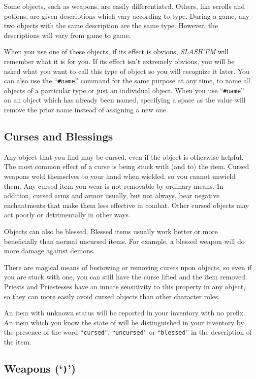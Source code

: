 Some objects, such as weapons, are easily differentiated.  Others, like
scrolls and potions, are given descriptions which vary according to
type.  During a game, any two objects with the same description are
the same type.  However, the descriptions will vary from game to game.

When you use one of these objects, if its effect is obvious, {\it SLASH'EM\/}
will remember what it is for you.  If its effect isn't extremely
obvious, you will be asked what you want to call this type of object
so you will recognize it later.  You can also use the ``{\tt \#name}''
command for the same purpose at any time, to name all objects of a
particular type or just an individual object.
When you use ``{\tt \#name}'' on an object which has already been named,
specifying a space as the value will remove the prior name instead
of assigning a new one.
\subsection*{Curses and Blessings}


Any object that you find may be cursed, even if the object is
otherwise helpful.  The most common effect of a curse is being stuck
with (and to) the item.  Cursed weapons weld themselves to your hand
when wielded, so you cannot unwield them.  Any cursed item you wear
is not removable by ordinary means.  In addition, cursed arms and armor
usually, but not always, bear negative enchantments that make them
less effective in combat.  Other cursed objects may act poorly or
detrimentally in other ways.

Objects can also be blessed.  Blessed items usually work better or
more beneficially than normal uncursed items.  For example, a blessed
weapon will do more damage against demons.

There are magical means of bestowing or removing curses upon objects,
so even if you are stuck with one, you can still have the curse
lifted and the item removed.  Priests and Priestesses have an innate
sensitivity to this property in any object, so they can more easily avoid
cursed objects than other character roles.

An item with unknown status will be reported in your inventory with no prefix.
An item which you know the state of will be distinguished in your inventory
by the presence of the word ``{\tt cursed}'', ``{\tt uncursed}'' or ``{\tt blessed}'' in the
description of the item.
\subsection*{Weapons (`{\tt )}')}

